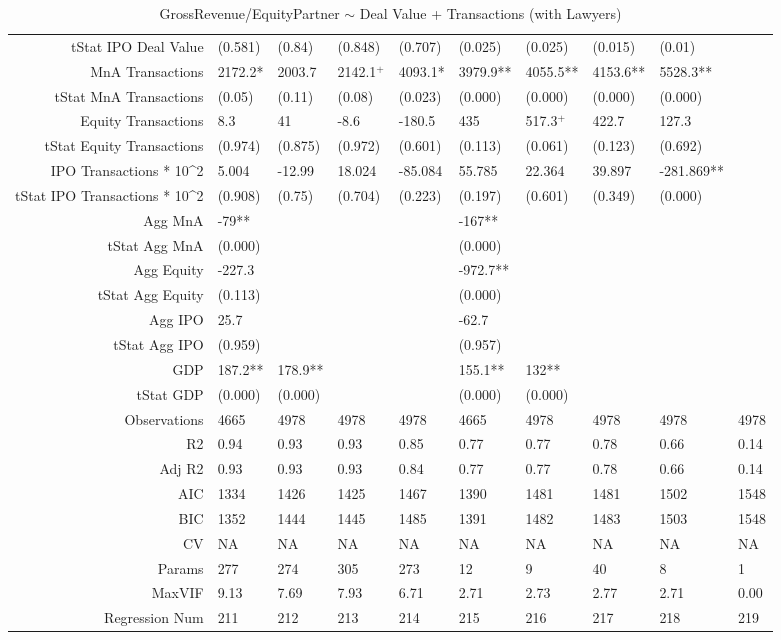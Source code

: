 \begin{table}[ht]
\begin{tabular}{rlllllllll}
  tStat IPO Deal Value & (0.581) & (0.84) & (0.848) & (0.707) & (0.025) & (0.025) & (0.015) & (0.01) &  \\ 
  MnA Transactions & 2172.2* & 2003.7 & 2142.1$^{+}$ & 4093.1* & 3979.9** & 4055.5** & 4153.6** & 5528.3** &  \\ 
  tStat MnA Transactions & (0.05) & (0.11) & (0.08) & (0.023) & (0.000) & (0.000) & (0.000) & (0.000) &  \\ 
  Equity Transactions & 8.3 & 41 & -8.6 & -180.5 & 435 & 517.3$^{+}$ & 422.7 & 127.3 &  \\ 
  tStat Equity Transactions & (0.974) & (0.875) & (0.972) & (0.601) & (0.113) & (0.061) & (0.123) & (0.692) &  \\ 
  IPO Transactions * 10^2 & 5.004 & -12.99 & 18.024 & -85.084 & 55.785 & 22.364 & 39.897 & -281.869** &  \\ 
  tStat IPO Transactions * 10^2 & (0.908) & (0.75) & (0.704) & (0.223) & (0.197) & (0.601) & (0.349) & (0.000) &  \\ 
  Agg MnA & -79** &  &  &  & -167** &  &  &  &  \\ 
  tStat Agg MnA & (0.000) &  &  &  & (0.000) &  &  &  &  \\ 
  Agg Equity & -227.3 &  &  &  & -972.7** &  &  &  &  \\ 
  tStat Agg Equity & (0.113) &  &  &  & (0.000) &  &  &  &  \\ 
  Agg IPO & 25.7 &  &  &  & -62.7 &  &  &  &  \\ 
  tStat Agg IPO & (0.959) &  &  &  & (0.957) &  &  &  &  \\ 
  GDP & 187.2** & 178.9** &  &  & 155.1** & 132** &  &  &  \\ 
  tStat GDP & (0.000) & (0.000) &  &  & (0.000) & (0.000) &  &  &  \\ 
  Observations & 4665 & 4978 & 4978 & 4978 & 4665 & 4978 & 4978 & 4978 & 4978 \\ 
  R2 & 0.94 & 0.93 & 0.93 & 0.85 & 0.77 & 0.77 & 0.78 & 0.66 & 0.14 \\ 
  Adj R2 & 0.93 & 0.93 & 0.93 & 0.84 & 0.77 & 0.77 & 0.78 & 0.66 & 0.14 \\ 
  AIC & 1334 & 1426 & 1425 & 1467 & 1390 & 1481 & 1481 & 1502 & 1548 \\ 
  BIC & 1352 & 1444 & 1445 & 1485 & 1391 & 1482 & 1483 & 1503 & 1548 \\ 
  CV & NA & NA & NA & NA & NA & NA & NA & NA & NA \\ 
  Params & 277 & 274 & 305 & 273 & 12 & 9 & 40 & 8 & 1 \\ 
  MaxVIF & 9.13 & 7.69 & 7.93 & 6.71 & 2.71 & 2.73 & 2.77 & 2.71 & 0.00 \\ 
  Regression Num & 211 & 212 & 213 & 214 & 215 & 216 & 217 & 218 & 219 \\ 
   \hline
\end{tabular}
\caption{GrossRevenue/EquityPartner $\sim$ Deal Value + Transactions (with Lawyers)} 
\end{table}
